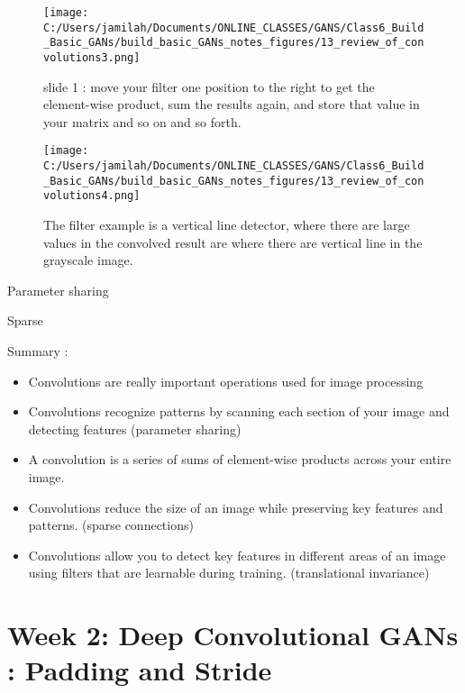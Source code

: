 \documentclass[11pt, onecolumn]{article}
\begin{document}
\begin{figure}[htp]
\begin{center}
\texttt{[image: C:/Users/jamilah/Documents/ONLINE\_CLASSES/GANS/Class6\_Build\_Basic\_GANs/build\_basic\_GANs\_notes\_figures/13\_review\_of\_convolutions3.png]}
\end{center}
\caption{slide 1 :  move your filter one position to the right to get the element-wise product, sum the results again, and store that value in your matrix and so on and so forth.}
\label{13_review_of_convolutions3}
\end{figure}

\begin{figure}[htp]
\begin{center}
\texttt{[image: C:/Users/jamilah/Documents/ONLINE\_CLASSES/GANS/Class6\_Build\_Basic\_GANs/build\_basic\_GANs\_notes\_figures/13\_review\_of\_convolutions4.png]}
\end{center}
\caption{The filter example is a vertical line detector, where there are large values in the convolved result are where there are vertical line in the grayscale image.}
\label{13_review_of_convolutions4}
\end{figure}

Parameter sharing


Sparse

Summary :
\begin{itemize}
\item Convolutions are really important operations used for image processing
\item Convolutions recognize patterns by scanning each section of your image and detecting features (parameter sharing)
\item A convolution is a series of sums of element-wise products across your entire image.
\item Convolutions reduce the size of an image while preserving key features and patterns. (sparse connections)
\item Convolutions allow you to detect key features in different areas of an image using filters that are learnable during training. (translational invariance)
\end{itemize}


\section{Week 2: Deep Convolutional GANs : Padding and Stride}
\end{document}
